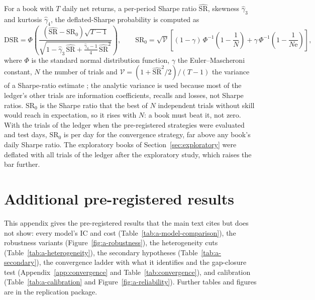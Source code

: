 For a book with $T$ daily net returns, a per-period Sharpe ratio $\widehat{\mathrm{SR}}$, skewness
$\hat\gamma_3$ and kurtosis $\hat\gamma_4$, the deflated-Sharpe probability \citep{bailey2014} is computed as
\begin{equation}\label{eq:dsr}
\mathrm{DSR} = \Phi\!\left(\frac{(\widehat{\mathrm{SR}} - \mathrm{SR}_0)\sqrt{T-1}}
{\sqrt{1 - \hat\gamma_3\,\widehat{\mathrm{SR}} + \tfrac{\hat\gamma_4 - 1}{4}\,\widehat{\mathrm{SR}}^{2}}}\right),
\qquad
\mathrm{SR}_0 = \sqrt{\mathcal{V}}\left[(1 - \gamma)\,\Phi^{-1}\!\left(1 - \frac{1}{N}\right)
+ \gamma\,\Phi^{-1}\!\left(1 - \frac{1}{N\mathrm{e}}\right)\right],
\end{equation}
where $\Phi$ is the standard normal distribution function, $\gamma$ the Euler--Mascheroni constant, $N$ the
number of trials and $\mathcal{V} = (1 + \widehat{\mathrm{SR}}^{2}/2)/(T-1)$ the variance of a Sharpe-ratio
estimate \citep{lo2002}; the analytic variance is used because most of the ledger's other trials are information
coefficients, recalls and losses, not Sharpe ratios. $\mathrm{SR}_0$ is the Sharpe ratio that the best of $N$
independent trials without skill would reach in expectation, so it rises with $N$: a book must beat it, not zero.
With the  trials of the ledger when the pre-registered strategies were evaluated and
 test days, $\mathrm{SR}_0$ is  per day for the convergence strategy, far above any
book's daily Sharpe ratio. The exploratory books of Section~\ref{sec:exploratory} were deflated with all
 trials of the ledger after the exploratory study, which raises the bar further.

\section{Additional pre-registered results}\label{app:results}

This appendix gives the pre-registered results that the main text cites but does not show: every model's IC
and cost (Table~\ref{tab:a-model-comparison}), the robustness variants (Figure~\ref{fig:a-robustness}), the
heterogeneity cuts (Table~\ref{tab:a-heterogeneity}), the secondary hypotheses (Table~\ref{tab:a-secondary}), the
convergence ladder with what it identifies and the gap-closure test (Appendix~\ref{app:convergence} and
Table~\ref{tab:convergence}), and calibration (Table~\ref{tab:a-calibration} and Figure~\ref{fig:a-reliability}).
Further tables and figures are in the replication package.

